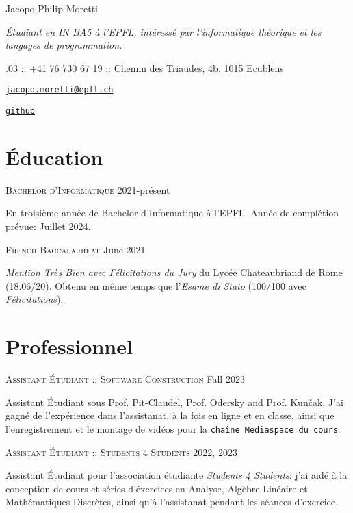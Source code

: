 \documentclass[11pt]{article}
\renewcommand{\url}[1]{{\texttt{#1}}}
\renewcommand{\line}[2]{{\vspace{4pt} \large \noindent\textsc{#1} \hfill #2}\vspace{4pt}}
\begin{document}
  \begin{center}
    \huge Jacopo Philip Moretti
  \end{center}

  \begin{adjustwidth}{1in}{1in}
    \textit{Étudiant en IN BA5 à l'EPFL, intéressé par l'informatique théorique et les langages de programmation.}

    .03 :: +41 76 730 67 19 :: Chemin des Triaudes, 4b, 1015 Ecublens

    \noindent \href{https://people.epfl.ch/jacopo.moretti}{\url{jacopo.moretti@epfl.ch}}

    \noindent \href{https://github.com/quartztz}{\url{github}}
  \end{adjustwidth}

  \section*{Éducation}

  \line{Bachelor d'Informatique}{2021-présent}

  En troisième année de Bachelor d'Informatique à l'EPFL. Année de complétion prévue: Juillet 2024. 

  \line{French Baccalaureat}{June 2021}

  \textit{Mention Très Bien avec Félicitations du Jury} du Lycée Chateaubriand de Rome (18.06/20). Obtenu en même temps que l'\textit{Esame di Stato} (100/100 avec \textit{Félicitations}).
  
  \section*{Professionnel}

  \line{Assistant Étudiant :: Software Construction}{Fall 2023}

  Assistant Étudiant sous Prof. Pit-Claudel, Prof. Odersky and Prof. Kunčak. J'ai gagné de l'expérience dans l'assistanat, à la fois en ligne et en classe, ainsi que l'enregistrement et le montage de vidéos pour la \href{https://mediaspace.epfl.ch/channel/CS-214+Software+construction/56193}{\url{chaîne Mediaspace du cours}}.

  \line{Assistant Étudiant :: Students 4 Students}{2022, 2023}

  Assistant Étudiant pour l'association étudiante \textit{Students 4 Students}: j'ai aidé à la conception de cours et séries d'éxercices en Analyse, Algèbre Linéaire et Mathématiques Discrètes, ainsi qu'à l'assistanat pendant les séances d'exercice.
\end{document}
